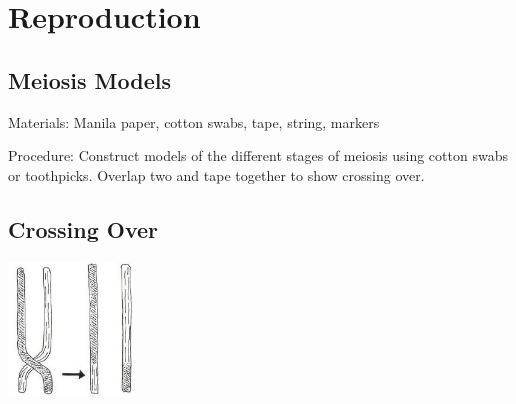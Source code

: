 \section{Reproduction}

\begin{multicols}{2}


\subsection{Meiosis Models} %


\begin{description*}
\item[Materials:]{Manila paper, cotton swabs, tape, string, markers}
\item[Procedure:]{Construct models of the different stages of meiosis using cotton swabs or toothpicks. Overlap two and tape together to show crossing over.}
\end{description*}

\subsection{Crossing Over} %

\begin{center}
\includegraphics[width=0.25\textwidth]{./img/vso/cross-over.jpg}
\end{center}


\end{multicols}
